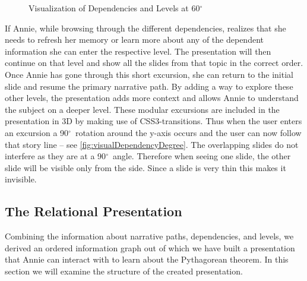 \documentclass{llncs}
\def\degree{\ensuremath{^\circ}}
\begin{document}
\begin{figure}\vspace{-2em}
  \vspace{-1.8em}
  \caption{Visualization of Dependencies and Levels at 60\degree}
  \label{fig:visualDependencyDegree}
\vspace{-1.8em}
\end{figure}
If Annie, while browsing through the different dependencies, realizes that she needs to
refresh her memory or learn more about any of the dependent information she can enter the
respective level. The presentation will then continue on that level and show all the
slides from that topic in the correct order. Once Annie has gone through this short
excursion, she can return to the initial slide and resume the primary narrative path. By
adding a way to explore these other levels, the presentation adds more context and allows
Annie to understand the subject on a deeper level. These modular excursions are included
in the presentation in 3D by making use of CSS3-transitions. Thus when the user enters an
excursion a 90\degree\ rotation around the y-axis occurs and the user can now follow that
story line -- see \autoref{fig:visualDependencyDegree}. The overlapping slides do not
interfere as they are at a 90\degree\ angle. Therefore when seeing one slide, the other
slide will be visible only from the side. Since a slide is very thin this makes it
invisible.

\subsection{The Relational Presentation}
\label{sec:RelationalPresentations}

Combining the information about narrative paths, dependencies, and levels, we derived an ordered information graph out of which we have built a presentation that Annie can interact with to learn about the Pythagorean theorem. In this section we will examine the structure of the created presentation.
\end{document}
